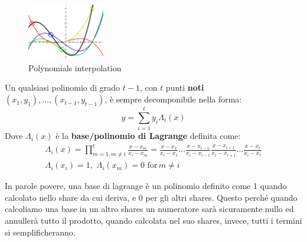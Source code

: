 \begin{corollary}\begin{figure}
  \vspace{-20pt}
  \begin{center}
    \includegraphics[width=0.3\textwidth]{image/secret_sharing/poly.png}
  \end{center}
  \vspace{-20pt}
  \caption{Polynomials interpolation}
    \label{fig:polyinter}
  \vspace{-10pt}
\end{figure}
Un qualsiasi polinomio di grado $t-1$, con $t$ punti \textbf{noti} $(x_1,y_1),\dots,(x_{t-1},y_{t-1})$, è sempre decomponibile nella forma:
\begin{equation}\label{eq:lagrangeinter}
    y=\sum_{i=1}^{t}y_i\Lambda_i(x)
\end{equation}
Dove $\Lambda_i(x)$ è la \textbf{base/polinomio di Lagrange} definita come:
\begin{equation}
    \begin{gathered}\label{eq:lagrangebase}
    \Lambda_i(x)  = \prod_{m=1,m\ne i}^{t}\frac{x-x_m}{x_i-x_m}=\frac{x-x_1}{x_i-x_1}\dots\frac{x-x_{i-1}}{x_i-x_{i-1}}\frac{x-x_{i+1}}{x_i-x_{i+1}}\dots\frac{x-x_t}{x_i-x_t}\\
    \Lambda_i(x_i) = 1,\,\,\Lambda_i(x_m)=0\,\,\text{for}\,m\ne i
\end{gathered}
\end{equation}
\end{corollary}
\begin{remark}
In parole povere, una base di lagrange è un polinomio definito come 1 quando calcolato nello share da cui deriva, e 0 per gli altri shares. Questo perché quando calcoliamo una base in un altro shares un numeratore sarà sicuramente nullo ed annullerà tutto il prodotto, quando calcolata nel suo shares, invece, tutti i termini si semplificheranno.
\end{remark}
